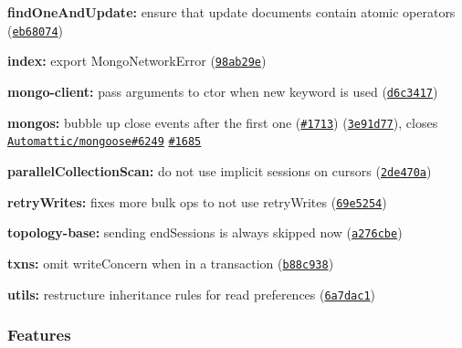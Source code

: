 \begin{DoxyItemize}
\item {\bfseries find\+One\+And\+Update\+:} ensure that update documents contain atomic operators (\href{https://github.com/mongodb/node-mongodb-native/commit/eb68074}{\tt eb68074})
\item {\bfseries index\+:} export Mongo\+Network\+Error (\href{https://github.com/mongodb/node-mongodb-native/commit/98ab29e}{\tt 98ab29e})
\item {\bfseries mongo-\/client\+:} pass arguments to ctor when new keyword is used (\href{https://github.com/mongodb/node-mongodb-native/commit/d6c3417}{\tt d6c3417})
\item {\bfseries mongos\+:} bubble up close events after the first one (\href{https://github.com/mongodb/node-mongodb-native/issues/1713}{\tt \#1713}) (\href{https://github.com/mongodb/node-mongodb-native/commit/3e91d77}{\tt 3e91d77}), closes \href{https://github.com/Automattic/mongoose/issues/6249}{\tt Automattic/mongoose\#6249} \href{https://github.com/mongodb/node-mongodb-native/issues/1685}{\tt \#1685}
\item {\bfseries parallel\+Collection\+Scan\+:} do not use implicit sessions on cursors (\href{https://github.com/mongodb/node-mongodb-native/commit/2de470a}{\tt 2de470a})
\item {\bfseries retry\+Writes\+:} fixes more bulk ops to not use retry\+Writes (\href{https://github.com/mongodb/node-mongodb-native/commit/69e5254}{\tt 69e5254})
\item {\bfseries topology-\/base\+:} sending {\ttfamily end\+Sessions} is always skipped now (\href{https://github.com/mongodb/node-mongodb-native/commit/a276cbe}{\tt a276cbe})
\item {\bfseries txns\+:} omit write\+Concern when in a transaction (\href{https://github.com/mongodb/node-mongodb-native/commit/b88c938}{\tt b88c938})
\item {\bfseries utils\+:} restructure inheritance rules for read preferences (\href{https://github.com/mongodb/node-mongodb-native/commit/6a7dac1}{\tt 6a7dac1})
\end{DoxyItemize}

\subsubsection*{Features}



